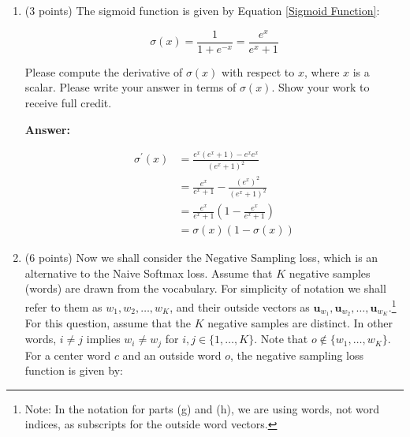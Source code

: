 \documentclass{article}
\newenvironment{answer}{
    {\bf Answer:} \sf \begingroup\color{red}
}{\endgroup}%
\begin{document}
\begin{enumerate}[label=(\alph*)]
\begin{shaded}
\begin{answer}
\end{answer}
\end{shaded}

\item (3 points) The sigmoid function is given by Equation \ref{Sigmoid Function}:

\begin{equation}
    \label{Sigmoid Function}
    \sigma (x) = \frac{1}{1 + e^{-x}} = \frac{e^{x}}{e^{x} + 1}
\end{equation}

Please compute the derivative of $\sigma(x)$ with respect to $x$, where $x$ is a scalar. Please write your answer in terms of $\sigma(x)$. Show your work to receive full credit.

\begin{shaded}
\begin{answer}

    \begin{equation}
        \begin{align}
            \sigma^\prime(x) &= \frac{e^x(e^x+1)-e^xe^x}{(e^{x}+1)^2} \\
            &=\frac{e^{x}}{e^{x}+1} - \frac{(e^{x})^2}{(e^{x}+1)^2} \\
            &=\frac{e^{x}}{e^{x}+1}(1-\frac{e^{x}}{e^{x}+1}) \\
            &=\sigma(x)(1-\sigma(x))
        \end{align}\label{eq:1f}
    \end{equation}

\end{answer}
\end{shaded}

\item (6 points) Now we shall consider the Negative Sampling loss, which is an alternative to the Naive Softmax loss.  Assume that $K$ negative samples (words) are drawn from the vocabulary. For simplicity of notation we shall refer to them as $w_1, w_2, \dots, w_K$, and their outside vectors as $\bm u_{w_1}, \bm u_{w_2}, \dots, \bm u_{w_K}$.\footnote{Note: In the notation for parts (g) and (h), we are using words, not word indices, as subscripts for the outside word vectors.} For this question, assume that the $K$ negative samples are distinct. In other words, $i\neq j$ implies $w_i\neq w_j$ for $i,j\in\{1,\dots,K\}$.
Note that $o\notin\{w_1, \dots, w_K\}$. 
For a center word $c$ and an outside word $o$, the negative sampling loss function is given by:


\end{enumerate}
\end{document}
